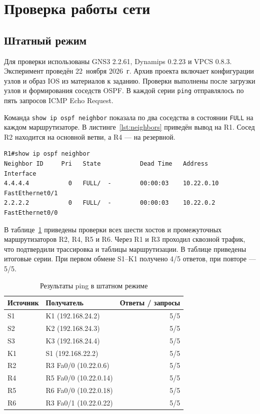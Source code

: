 \documentclass[a4paper,14pt]{extarticle}
\begin{document}
\clearpage
\section{Проверка работы сети}

\subsection{Штатный режим}

Для проверки использованы GNS3 2.2.61, Dynamips 0.2.23 и
VPCS 0.8.3. Эксперимент проведён 22~ноября 2026~г. Архив проекта
включает конфигурации узлов и образ IOS из материалов к заданию.
Проверки выполнены после загрузки
узлов и формирования соседств OSPF. В каждой серии \texttt{ping} отправлялось по пять запросов ICMP Echo Request.

Команда \texttt{show ip ospf neighbor} показала по два соседства
в состоянии \texttt{FULL} на каждом маршрутизаторе. В
листинге~\ref{lst:neighbors} приведён вывод на R1. Сосед R2 находится
на основной ветви, а R4 --- на резервной.

{\singlespacing
\begin{lstlisting}[caption={Соседства OSPF на R1},label={lst:neighbors},basicstyle=\ttfamily\footnotesize]
R1#show ip ospf neighbor
Neighbor ID     Pri   State           Dead Time   Address         Interface
4.4.4.4           0   FULL/  -        00:00:03    10.22.0.10      FastEthernet0/1
2.2.2.2           0   FULL/  -        00:00:03    10.22.0.2       FastEthernet0/0
\end{lstlisting}
}

В таблице~\ref{tab:ping} приведены проверки всех шести хостов и
промежуточных маршрутизаторов R2, R4, R5 и R6. Через R1 и R3
проходил сквозной трафик, что подтвердили трассировка и таблицы
маршрутизации. В таблице приведены итоговые серии. При первом обмене S1--K1 получено 4/5 ответов, при повторе --- 5/5.

\begin{table}[htbp]
  \centering\small
  \caption{Результаты ping в штатном режиме}
  \label{tab:ping}
  \begin{tabularx}{\linewidth}{@{}lXr@{}}
    \toprule
    Источник & Получатель & Ответы / запросы \\
    \midrule
    S1 & K1 (192.168.24.2) & 5/5 \\
    S2 & K2 (192.168.24.3) & 5/5 \\
    S3 & K3 (192.168.24.4) & 5/5 \\
    K1 & S1 (192.168.22.2) & 5/5 \\
    R2 & R3 Fa0/0 (10.22.0.6) & 5/5 \\
    R4 & R5 Fa0/0 (10.22.0.14) & 5/5 \\
    R5 & R6 Fa0/0 (10.22.0.18) & 5/5 \\
    R6 & R3 Fa0/1 (10.22.0.22) & 5/5 \\
    \bottomrule
  \end{tabularx}
\end{table}
\end{document}
